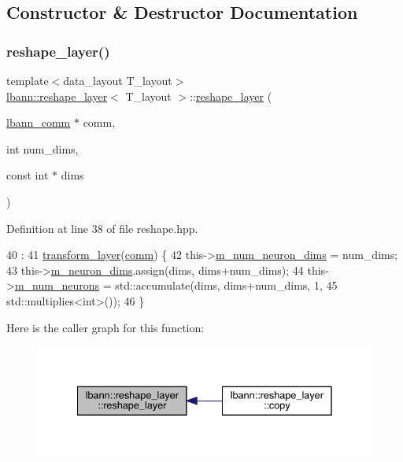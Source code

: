 \subsection{Constructor \& Destructor Documentation}
\mbox{\label{classlbann_1_1reshape__layer_a6161e3231e7a120bdfc0739eac08d196}} 
\subsubsection{\texorpdfstring{reshape\+\_\+layer()}{reshape\_layer()}}
{\footnotesize\ttfamily template$<$data\+\_\+layout T\+\_\+layout$>$ \\
\hyperlink{classlbann_1_1reshape__layer}{lbann\+::reshape\+\_\+layer}$<$ T\+\_\+layout $>$\+::\hyperlink{classlbann_1_1reshape__layer}{reshape\+\_\+layer} (\begin{DoxyParamCaption}\item[{\hyperlink{classlbann_1_1lbann__comm}{lbann\+\_\+comm} $\ast$}]{comm,  }\item[{int}]{num\+\_\+dims,  }\item[{const int $\ast$}]{dims }\end{DoxyParamCaption})\hspace{0.3cm}{\ttfamily [inline]}}



Definition at line 38 of file reshape.\+hpp.


\begin{DoxyCode}
40                                  :
41     \hyperlink{classlbann_1_1transform__layer_a4b72501e0f4d0745c8b13c5331055e65}{transform\_layer}(\hyperlink{file__io_8cpp_ab048c6f9fcbcfaa57ce68b00263dbebe}{comm}) \{
42     this->\hyperlink{classlbann_1_1Layer_adfd6178d21498c9095cd947ae1eb2d6a}{m\_num\_neuron\_dims} = num\_dims;
43     this->\hyperlink{classlbann_1_1Layer_abb34bb8031f57a483e2e327a5f229f48}{m\_neuron\_dims}.assign(dims, dims+num\_dims);
44     this->\hyperlink{classlbann_1_1Layer_a6b5ebc8a7d9329d8a773ed787e7b41d8}{m\_num\_neurons} = std::accumulate(dims, dims+num\_dims, 1,
45                                           std::multiplies<int>());
46   \}
\end{DoxyCode}
Here is the caller graph for this function\+:\nopagebreak
\begin{figure}[H]
\begin{center}
\leavevmode
\includegraphics[width=335pt]{classlbann_1_1reshape__layer_a6161e3231e7a120bdfc0739eac08d196_icgraph}
\end{center}
\end{figure}


